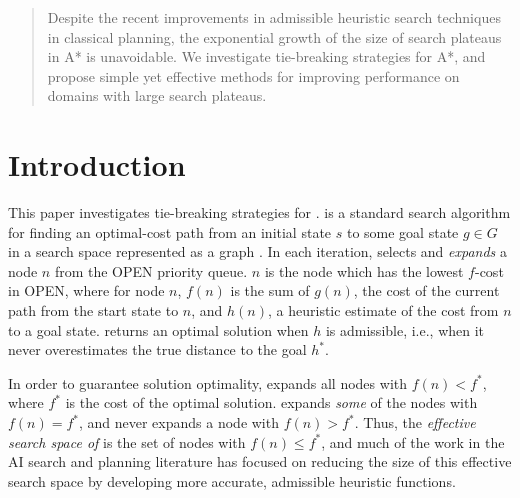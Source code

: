 


\begin{abstract}
Despite the recent improvements in admissible heuristic search techniques
in classical planning, the exponential growth of
the size of search plateaus in A* is unavoidable.
We investigate tie-breaking strategies for A*, and propose simple yet effective methods for improving performance on domains with large search plateaus.

\end{abstract}

\section{Introduction}
\label{sec-1}


This paper investigates tie-breaking strategies for \astar.
\astar is a standard search algorithm for finding an optimal-cost path 
from an initial state $s$ to some goal state $g \in G$ in a search space represented as a graph \cite{hart1968formal}.
In each iteration, \astar selects and \emph{expands} a node $n$ from the OPEN priority queue.
$n$ is the node which has the lowest $f$-cost in OPEN, where for node $n$, $f(n)$ is the sum of  $g(n)$, the cost of the current path from the start state to $n$, and $h(n)$, a heuristic estimate of the cost from $n$ to a goal state.
\astar returns an optimal solution when $h$ is admissible, i.e., when it
never overestimates the true distance to the goal $h^*$.

In order to guarantee solution optimality, \astar expands all
nodes with $f(n) < f^*$, where $f^*$ is the cost of the optimal solution.
\astar expands \emph{some} of the nodes with $f(n) = f^*$, and never expands a node with $f(n) > f^*$.
Thus, the \emph{effective search space of \astar} is the set of nodes with 
$f(n) \leq f^*$, and
much of the work in the AI search and planning literature  has focused
on reducing the size of this effective search space by
developing more accurate, admissible heuristic functions.

